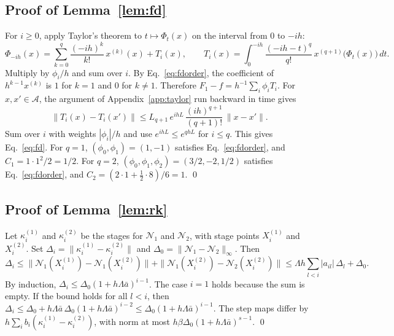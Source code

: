 \documentclass[11pt]{article}
\theoremstyle{definition}
\theoremstyle{remark}
\newcommand{\Aset}{\mathcal{A}}          %
\begin{document}
\subsection{Proof of Lemma~\ref{lem:fd}}\label{app:fd}
For $i \ge 0$, apply Taylor's theorem to $t \mapsto \Phi_t(x)$ on the interval from $0$ to $-ih$:
\begin{equation*}
\Phi_{-ih}(x) = \sum_{k=0}^{q} \frac{(-ih)^k}{k!}\, x^{(k)}(x) + T_i(x), \qquad T_i(x) = \int_0^{-ih} \frac{(-ih - t)^q}{q!}\, x^{(q+1)}\big(\Phi_t(x)\big)\,dt.
\end{equation*}
Multiply by $\phi_i/h$ and sum over $i$.
By Eq.~\eqref{eq:fdorder}, the coefficient of $h^{k-1} x^{(k)}$ is $1$ for $k = 1$ and $0$ for $k \ne 1$.
Therefore $F_1 - f = h^{-1}\sum_i \phi_i T_i$.
For $x, x' \in \Aset$, the argument of Appendix~\ref{app:taylor} run backward in time gives
\begin{equation*}
\|T_i(x) - T_i(x')\| \le L_{q+1}\, e^{ihL}\, \frac{(ih)^{q+1}}{(q+1)!}\, \|x - x'\|.
\end{equation*}
Sum over $i$ with weights $|\phi_i|/h$ and use $e^{ihL} \le e^{qhL}$ for $i \le q$.
This gives Eq.~\eqref{eq:fd}.
For $q = 1$, $(\phi_0, \phi_1) = (1, -1)$ satisfies Eq.~\eqref{eq:fdorder}, and $C_1 = 1 \cdot 1^2/2 = 1/2$.
For $q = 2$, $(\phi_0, \phi_1, \phi_2) = (3/2, -2, 1/2)$ satisfies Eq.~\eqref{eq:fdorder}, and $C_2 = (2 \cdot 1 + \tfrac12 \cdot 8)/6 = 1$. \qed

\subsection{Proof of Lemma~\ref{lem:rk}}\label{app:rk}
Let $\kappa_i^{(1)}$ and $\kappa_i^{(2)}$ be the stages for $\mathcal N_1$ and $\mathcal N_2$, with stage points $X_i^{(1)}$ and $X_i^{(2)}$.
Set $\Delta_i = \|\kappa_i^{(1)} - \kappa_i^{(2)}\|$ and $\Delta_0 = \|\mathcal N_1 - \mathcal N_2\|_\infty$.
Then
\begin{equation*}
\Delta_i \le \|\mathcal N_1(X_i^{(1)}) - \mathcal N_1(X_i^{(2)})\| + \|\mathcal N_1(X_i^{(2)}) - \mathcal N_2(X_i^{(2)})\| \le \Lambda h \sum_{l<i} |a_{il}|\,\Delta_l + \Delta_0.
\end{equation*}
By induction, $\Delta_i \le \Delta_0(1 + h\Lambda\bar a)^{i-1}$.
The case $i = 1$ holds because the sum is empty.
If the bound holds for all $l < i$, then $\Delta_i \le \Delta_0 + h\Lambda\bar a\,\Delta_0(1 + h\Lambda\bar a)^{i-2} \le \Delta_0(1 + h\Lambda\bar a)^{i-1}$.
The step maps differ by $h\sum_i b_i(\kappa_i^{(1)} - \kappa_i^{(2)})$, with norm at most $h\beta\Delta_0(1 + h\Lambda\bar a)^{s-1}$. \qed
\end{document}

